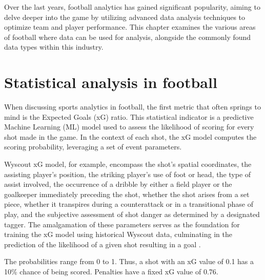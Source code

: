 \documentclass[twoside,nohyper]{tufte-book}
\begin{document}
Over the last years, football analytics has gained significant
popularity, aiming to delve deeper into the game by utilizing advanced
data analysis techniques to optimize team and player performance. This
chapter examines the various areas of football where data can be used
for analysis, alongside the commonly found data types within this
industry.

\hypertarget{statistical-analysis-in-football}{%
\chapter{Statistical analysis in football}\label{statistical-analysis-in-football}}

When discussing sports analytics in football, the first metric that
often springs to mind is the Expected Goals (xG) ratio. This statistical
indicator is a predictive Machine Learning (ML) model used to assess the
likelihood of scoring for every shot made in the game. In the context of
each shot, the xG model computes the scoring probability, leveraging a
set of event parameters.

Wyscout xG model, for example, encompass the shot's spatial coordinates,
the assisting player's position, the striking player's use of foot or
head, the type of assist involved, the occurrence of a dribble by either
a field player or the goalkeeper immediately preceding the shot, whether
the shot arises from a set piece, whether it transpires during a
counterattack or in a transitional phase of play, and the subjective
assessment of shot danger as determined by a designated tagger. The
amalgamation of these parameters serves as the foundation for training
the xG model using historical Wyscout data, culminating in the
prediction of the likelihood of a given shot resulting in a goal
\citep{wyscout}.

The probabilities range from 0 to 1. Thus, a shot with an xG value of
0.1 has a 10\% chance of being scored. Penalties have a fixed xG value of
0.76.
\end{document}
